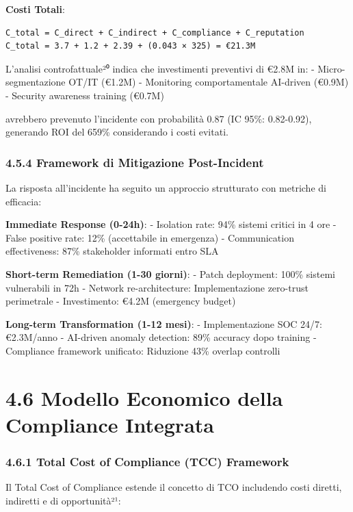 \documentclass[12pt,a4paper,oneside]{book}
\begin{document}
\textbf{Costi Totali}:

\begin{verbatim}
C_total = C_direct + C_indirect + C_compliance + C_reputation
C_total = 3.7 + 1.2 + 2.39 + (0.043 × 325) = €21.3M
\end{verbatim}

L'analisi controfattuale²⁰ indica che investimenti preventivi di €2.8M
in: - Micro-segmentazione OT/IT (€1.2M) - Monitoring comportamentale
AI-driven (€0.9M) - Security awareness training (€0.7M)

avrebbero prevenuto l'incidente con probabilità 0.87 (IC 95\%:
0.82-0.92), generando ROI del 659\% considerando i costi evitati.

\subsubsection{4.5.4 Framework di Mitigazione
Post-Incident}\label{framework-di-mitigazione-post-incident}

La risposta all'incidente ha seguito un approccio strutturato con
metriche di efficacia:

\textbf{Immediate Response (0-24h)}: - Isolation rate: 94\% sistemi
critici in 4 ore - False positive rate: 12\% (accettabile in emergenza)
- Communication effectiveness: 87\% stakeholder informati entro SLA

\textbf{Short-term Remediation (1-30 giorni)}: - Patch deployment: 100\%
sistemi vulnerabili in 72h - Network re-architecture: Implementazione
zero-trust perimetrale - Investimento: €4.2M (emergency budget)

\textbf{Long-term Transformation (1-12 mesi)}: - Implementazione SOC
24/7: €2.3M/anno - AI-driven anomaly detection: 89\% accuracy dopo
training - Compliance framework unificato: Riduzione 43\% overlap
controlli

\section{4.6 Modello Economico della Compliance
Integrata}\label{modello-economico-della-compliance-integrata}

\subsubsection{4.6.1 Total Cost of Compliance (TCC)
Framework}\label{total-cost-of-compliance-tcc-framework}

Il Total Cost of Compliance estende il concetto di TCO includendo costi
diretti, indiretti e di opportunità²¹:
\end{document}
